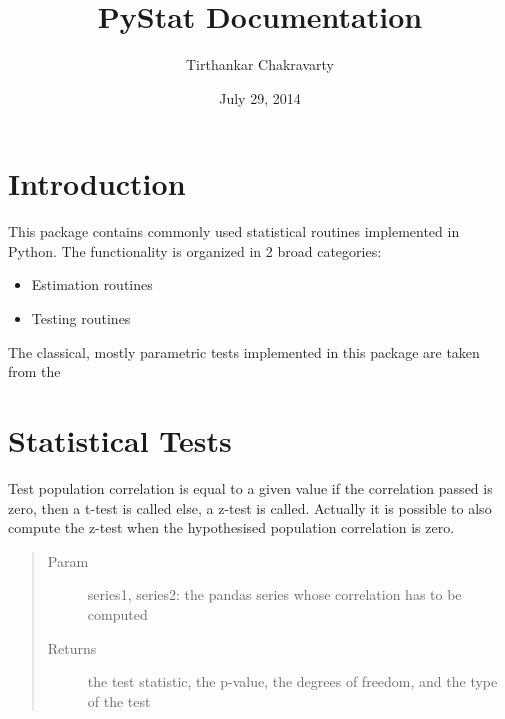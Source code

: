 \documentclass[letterpaper,10pt,english]{sphinxmanual}
\title{PyStat Documentation}
\date{July 29, 2014}
\author{Tirthankar Chakravarty}
\begin{document}
\maketitle
\tableofcontents
{}\label{index::doc}



\chapter{Introduction}
\label{index:pystat-documentation}\label{index:introduction}
This package contains commonly used statistical routines implemented in Python.
The functionality is organized in 2 broad categories:
\begin{itemize}
\item {} 
Estimation routines

\item {} 
Testing routines

\end{itemize}

The classical, mostly parametric tests implemented in this package are taken from the


\chapter{Statistical Tests}
\label{index:module-tests.tests}\label{index:statistical-tests}

\begin{fulllineitems}
\label{index:tests.tests.test_correlation}
Test population correlation is equal to a given value
if the correlation passed is zero, then a t-test is called
else, a z-test is called. Actually it is possible to also compute the
z-test when the hypothesised population correlation is zero.
\begin{quote}\begin{description}
\item[{Param}] \leavevmode
series1, series2: the pandas series whose correlation has to be computed

\item[{Returns}] \leavevmode
the test statistic, the p-value, the degrees of freedom, and the type of the test

\end{description}\end{quote}

\end{fulllineitems}
\end{document}
